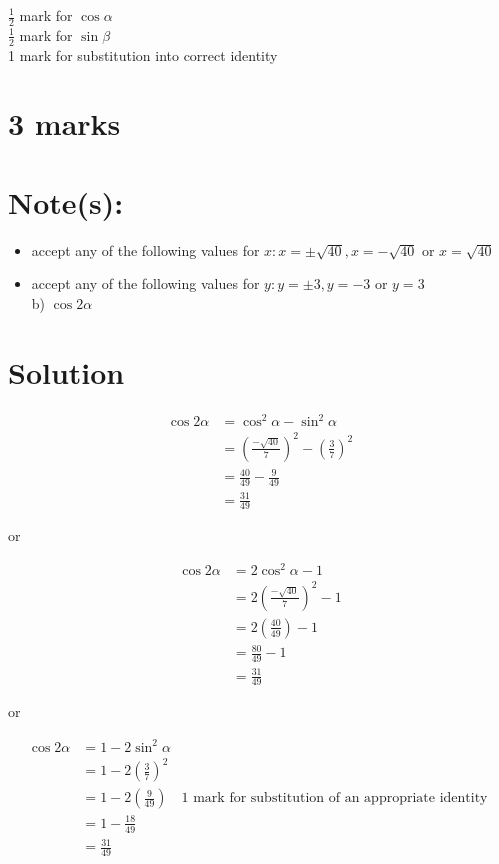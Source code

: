 \documentclass[10pt]{article}
\begin{document}
$\frac{1}{2}$ mark for $\cos \alpha$\\
$\frac{1}{2}$ mark for $\sin \beta$\\
1 mark for substitution into correct identity

\section*{3 marks}
\section*{Note(s):}
\begin{itemize}
  \item accept any of the following values for $x: x= \pm \sqrt{40}, x=-\sqrt{40}$ or $x=\sqrt{40}$
  \item accept any of the following values for $y: y= \pm 3, y=-3$ or $y=3$\\
b) $\cos 2 \alpha$
\end{itemize}

\section*{Solution}
$$
\begin{aligned}
\cos 2 \alpha & =\cos ^{2} \alpha-\sin ^{2} \alpha \\
& =\left(\frac{-\sqrt{40}}{7}\right)^{2}-\left(\frac{3}{7}\right)^{2} \\
& =\frac{40}{49}-\frac{9}{49} \\
& =\frac{31}{49}
\end{aligned}
$$

or

$$
\begin{aligned}
\cos 2 \alpha & =2 \cos ^{2} \alpha-1 \\
& =2\left(\frac{-\sqrt{40}}{7}\right)^{2}-1 \\
& =2\left(\frac{40}{49}\right)-1 \\
& =\frac{80}{49}-1 \\
& =\frac{31}{49}
\end{aligned}
$$

or

$$
\begin{aligned}
\cos 2 \alpha & =1-2 \sin ^{2} \alpha \\
& =1-2\left(\frac{3}{7}\right)^{2} \\
& =1-2\left(\frac{9}{49}\right) \quad 1 \text { mark for substitution of an appropriate identity } \\
& =1-\frac{18}{49} \\
& =\frac{31}{49}
\end{aligned}
$$
\end{document}
